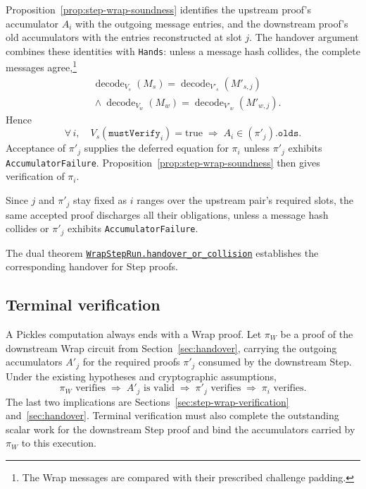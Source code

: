 \documentclass[11pt,a4paper]{article}
\newcommand{\inlinecode}[1]{\mbox{\texttt{#1}}}
\theoremstyle{definition}
\theoremstyle{insetstatement}
\begin{document}
Proposition~\ref{prop:step-wrap-soundness} identifies the upstream proof's
accumulator $A_i$ with the outgoing message entries, and the downstream
proof's old accumulators with the entries reconstructed at slot $j$.
The handover argument combines these identities with \inlinecode{Hands}:
unless a message hash collides, the complete messages agree,\footnote{The
  Wrap messages are compared with their prescribed challenge padding.}
\[
  \begin{aligned}
    &\operatorname{decode}_{V_s}(M_s)
      =\operatorname{decode}_{V'_s}(M'_{s,j})\\
    &{}\land\operatorname{decode}_{V_w}(M_w)
      =\operatorname{decode}_{V'_w}(M'_{w,j}).
  \end{aligned}
\]
Hence
\[
  \forall\,i,\quad V_s(\mathtt{mustVerify}_i)=\mathrm{true}
  \;\Longrightarrow\; A_i \in (\pi'_j).\mathtt{olds}.
\]
Acceptance of $\pi'_j$ supplies the deferred equation for $\pi_i$
unless $\pi'_j$ exhibits \inlinecode{AccumulatorFailure}.
Proposition~\ref{prop:step-wrap-soundness} then gives verification of $\pi_i$.

Since $j$ and $\pi'_j$ stay fixed as $i$ ranges over the upstream pair's
required slots, the same accepted proof discharges all their obligations,
unless a message hash collides or $\pi'_j$ exhibits
\inlinecode{AccumulatorFailure}.

The dual theorem
\href{https://github.com/l-adic/snarky/blob/main/formal/pickles/Pickles/Soundness/Handover.lean\#L732}{\inlinecode{WrapStepRun.handover\_or\_collision}}
establishes the corresponding handover for Step proofs.

\subsection{Terminal verification}
\label{sec:terminal-verification}

A Pickles computation always ends with a Wrap proof. Let $\pi_W$ be a proof
of the downstream Wrap circuit from Section~\ref{sec:handover}, carrying the
outgoing accumulators $A'_j$ for the required proofs $\pi'_j$ consumed by
the downstream Step. Under the existing hypotheses and cryptographic assumptions,
\[
  \pi_W\text{ verifies}
  \;\Longrightarrow\; A'_j\text{ is valid}
  \;\Longrightarrow\; \pi'_j\text{ verifies}
  \;\Longrightarrow\; \pi_i\text{ verifies}.
\]
The last two implications are Sections~\ref{sec:step-wrap-verification}
and~\ref{sec:handover}. Terminal verification must also complete the
outstanding scalar work for the downstream Step proof and bind the
accumulators carried by $\pi_W$ to this execution.
\end{document}
